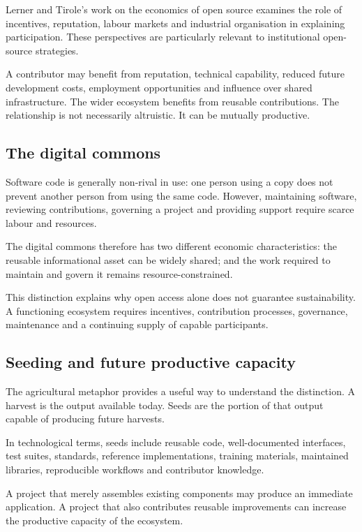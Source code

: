 \documentclass[11pt,a4paper]{article}
\begin{document}
Lerner and Tirole's work on the economics of open source examines the role of incentives, reputation, labour markets and industrial organisation in explaining participation. These perspectives are particularly relevant to institutional open-source strategies.

A contributor may benefit from reputation, technical capability, reduced future development costs, employment opportunities and influence over shared infrastructure. The wider ecosystem benefits from reusable contributions. The relationship is not necessarily altruistic. It can be mutually productive.

\subsection{The digital commons}
Software code is generally non-rival in use: one person using a copy does not prevent another person from using the same code. However, maintaining software, reviewing contributions, governing a project and providing support require scarce labour and resources.

The digital commons therefore has two different economic characteristics: the reusable informational asset can be widely shared; and the work required to maintain and govern it remains resource-constrained.

This distinction explains why open access alone does not guarantee sustainability. A functioning ecosystem requires incentives, contribution processes, governance, maintenance and a continuing supply of capable participants.

\subsection{Seeding and future productive capacity}
The agricultural metaphor provides a useful way to understand the distinction. A harvest is the output available today. Seeds are the portion of that output capable of producing future harvests.

In technological terms, seeds include reusable code, well-documented interfaces, test suites, standards, reference implementations, training materials, maintained libraries, reproducible workflows and contributor knowledge.

A project that merely assembles existing components may produce an immediate application. A project that also contributes reusable improvements can increase the productive capacity of the ecosystem.
\end{document}
